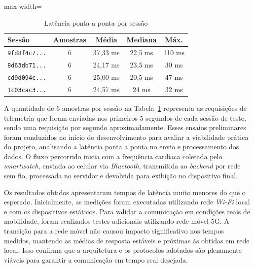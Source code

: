 \begin{table}[!ht]
    \centering
    \caption{Latência ponta a ponta por sessão}
    \label{tab:latencia-sessao}
    \begin{adjustbox}{max width=\columnwidth}
    \begin{tabular}{lcccc}
        \hline
        \textbf{Sessão} & \textbf{Amostras} & \textbf{Média} & \textbf{Mediana} & \textbf{Máx.} \\
        \hline
        \texttt{9fd8f4c7...} & 6 & 37,33 ms & 22,5 ms & 110 ms \\
        \texttt{8d63db71...} & 6 & 24,17 ms & 23,5 ms & 30 ms \\
        \texttt{cd9d094c...} & 6 & 25,00 ms & 20,5 ms & 47 ms \\
        \texttt{1c03cac3...} & 6 & 24,57 ms & 24 ms & 32 ms \\
        \hline
    \end{tabular}
    \end{adjustbox}
\end{table}
A quantidade de 6 amostras por sessão na Tabela~\ref{tab:latencia-sessao} representa as requisições de telemetria que foram enviadas nos primeiros 5 segundos de cada sessão de teste, sendo uma requisição por segundo aproximadamente. Esses ensaios preliminares foram conduzidos no início do desenvolvimento para avaliar a viabilidade prática do projeto, analisando a latência ponta a ponta no envio e processamento dos dados. O fluxo percorrido inicia com a frequência cardíaca coletada pelo \textit{smartwatch}, enviada ao celular via \textit{Bluetooth}, transmitida ao \textit{backend} por rede sem fio, processada no servidor e devolvida para exibição no dispositivo final.

Os resultados obtidos apresentaram tempos de latência muito menores do que o esperado. Inicialmente, as medições foram executadas utilizando rede \textit{Wi-Fi} local e com os dispositivos estáticos. Para validar a comunicação em condições reais de mobilidade, foram realizados testes adicionais utilizando rede móvel 5G. A transição para a rede móvel não causou impacto significativo nos tempos medidos, mantendo as médias de resposta estáveis e próximas às obtidas em rede local. Isso confirma que a arquitetura e os protocolos adotados são plenamente viáveis para garantir a comunicação em tempo real desejada.

